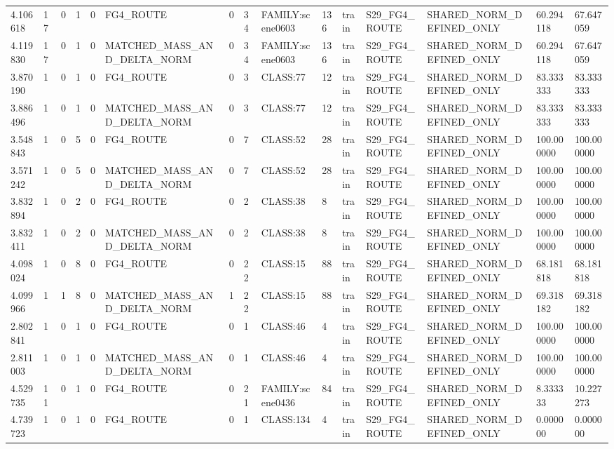\begin{tabular}{lllllllllllllll}
4.106618 & 17 & 0 & 1 & 0 & FG4\_ROUTE & 0 & 34 & FAMILY:scene0603 & 136 & train & S29\_FG4\_ROUTE & SHARED\_NORM\_DEFINED\_ONLY & 60.294118 & 67.647059 \\
4.119830 & 17 & 0 & 1 & 0 & MATCHED\_MASS\_AND\_DELTA\_NORM & 0 & 34 & FAMILY:scene0603 & 136 & train & S29\_FG4\_ROUTE & SHARED\_NORM\_DEFINED\_ONLY & 60.294118 & 67.647059 \\
3.870190 & 1 & 0 & 1 & 0 & FG4\_ROUTE & 0 & 3 & CLASS:77 & 12 & train & S29\_FG4\_ROUTE & SHARED\_NORM\_DEFINED\_ONLY & 83.333333 & 83.333333 \\
3.886496 & 1 & 0 & 1 & 0 & MATCHED\_MASS\_AND\_DELTA\_NORM & 0 & 3 & CLASS:77 & 12 & train & S29\_FG4\_ROUTE & SHARED\_NORM\_DEFINED\_ONLY & 83.333333 & 83.333333 \\
3.548843 & 1 & 0 & 5 & 0 & FG4\_ROUTE & 0 & 7 & CLASS:52 & 28 & train & S29\_FG4\_ROUTE & SHARED\_NORM\_DEFINED\_ONLY & 100.000000 & 100.000000 \\
3.571242 & 1 & 0 & 5 & 0 & MATCHED\_MASS\_AND\_DELTA\_NORM & 0 & 7 & CLASS:52 & 28 & train & S29\_FG4\_ROUTE & SHARED\_NORM\_DEFINED\_ONLY & 100.000000 & 100.000000 \\
3.832894 & 1 & 0 & 2 & 0 & FG4\_ROUTE & 0 & 2 & CLASS:38 & 8 & train & S29\_FG4\_ROUTE & SHARED\_NORM\_DEFINED\_ONLY & 100.000000 & 100.000000 \\
3.832411 & 1 & 0 & 2 & 0 & MATCHED\_MASS\_AND\_DELTA\_NORM & 0 & 2 & CLASS:38 & 8 & train & S29\_FG4\_ROUTE & SHARED\_NORM\_DEFINED\_ONLY & 100.000000 & 100.000000 \\
4.098024 & 1 & 0 & 8 & 0 & FG4\_ROUTE & 0 & 22 & CLASS:15 & 88 & train & S29\_FG4\_ROUTE & SHARED\_NORM\_DEFINED\_ONLY & 68.181818 & 68.181818 \\
4.099966 & 1 & 1 & 8 & 0 & MATCHED\_MASS\_AND\_DELTA\_NORM & 1 & 22 & CLASS:15 & 88 & train & S29\_FG4\_ROUTE & SHARED\_NORM\_DEFINED\_ONLY & 69.318182 & 69.318182 \\
2.802841 & 1 & 0 & 1 & 0 & FG4\_ROUTE & 0 & 1 & CLASS:46 & 4 & train & S29\_FG4\_ROUTE & SHARED\_NORM\_DEFINED\_ONLY & 100.000000 & 100.000000 \\
2.811003 & 1 & 0 & 1 & 0 & MATCHED\_MASS\_AND\_DELTA\_NORM & 0 & 1 & CLASS:46 & 4 & train & S29\_FG4\_ROUTE & SHARED\_NORM\_DEFINED\_ONLY & 100.000000 & 100.000000 \\
4.529735 & 11 & 0 & 1 & 0 & FG4\_ROUTE & 0 & 21 & FAMILY:scene0436 & 84 & train & S29\_FG4\_ROUTE & SHARED\_NORM\_DEFINED\_ONLY & 8.333333 & 10.227273 \\
4.739723 & 1 & 0 & 1 & 0 & FG4\_ROUTE & 0 & 1 & CLASS:134 & 4 & train & S29\_FG4\_ROUTE & SHARED\_NORM\_DEFINED\_ONLY & 0.000000 & 0.000000 \\

\end{tabular}
